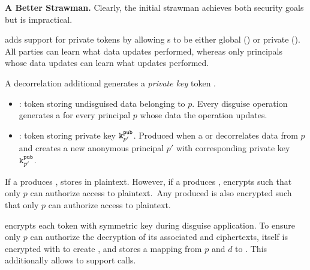 \vspace{6pt}
\noindent\textbf{A Better Strawman.}
Clearly, the initial strawman achieves both security goals but is impractical.



\sys adds support for private tokens by allowing s to be either global () or
private ().  All parties can learn what data updates  performed, whereas only
principals whose data  updates can learn what updates  performed.


\noindent
A decorrelation  additional generates a \emph{private key} token .
\begin{itemize}
    \item {}: token storing undisguised data belonging to $p$.
    Every disguise operation generates a  for every principal $p$ whose data the operation
    updates.
\item {}: token storing private key $\texttt{\ensuremath{\texttt{k}^{\text{pub}}_{p'}}}$. Produced when a  or  
    decorrelates data from $p$ and creates a new anonymous principal $p'$ with corresponding private key $\texttt{\ensuremath{\texttt{k}^{\text{pub}}_{p'}}}$.
\end{itemize}

If a  produces , \sys stores  in plaintext.
However, if a  produces , \sys encrypts  
such that only $p$ can authorize access to  plaintext.\
Any produced  is also encrypted such that only $p$ can authorize access to  plaintext.

\sys encrypts each token with symmetric key  during disguise application. 
To ensure only $p$ can authorize the decryption of its associated \tdata{pd} and 
ciphertexts, \symk{pd} itself is encrypted with \pubk{p} to create , and \sys stores a mapping
from $p$ and $d$ to \ek{pd}. This additionally allows \sys to support \fn{LoadEncKey/LoadEncKeys}
calls.


